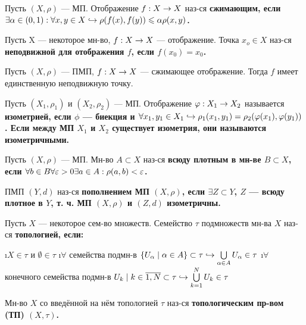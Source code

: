 \begin{defn}
Пусть $(X, \rho)$ --- МП. Отображение $f: X \rightarrow X$ наз-ся \bf{сжимающим}, если $\exists \alpha \in (0, 1): \forall x, y \in X \hookrightarrow \rho(f(x), f(y)) \leqslant \alpha \rho(x, y)$.
\end{defn}

\begin{defn}
Пусть X --- некоторое мн-во, $f: X \rightarrow X$ --- отображение. Точка $x_o \in X$ наз-ся \bf{неподвижной} для отображения $f$, если $f(x_0) = x_0$.
\end{defn}

\begin{thm}
Пусть $(X, \rho)$ --- ПМП, $f: X \rightarrow X$ --- сжимающее отображение. Тогда $f$ имеет единственную неподвижную точку.
\end{thm}

\begin{defn}
Пусть $(X_1, \rho_1)$ и $(X_2, \rho_2)$ --- МП. Отображение $\varphi: X_1 \rightarrow X_2$ называется \bf{изометрией}, если $\phi$ --- биекция и $\forall x_1, y_1 \in X_1 \hookrightarrow \rho_1(x_1, y_1) = \rho_2(\varphi(x_1), \varphi(y_1))$. Если между МП $X_1$ и $X_2$ существует изометрия, они называются \bf{изометричными}.
\end{defn}

\begin{defn}
Пусть $(X, \rho)$ --- МП. Мн-во $A \subset X$ наз-ся \bf{всюду плотным в мн-ве $B \subset X$}, если $\forall b \in B \forall \varepsilon > 0 \exists a \in A: \rho(a, b) < \varepsilon$.
\end{defn}

\begin{defn}
ПМП $(Y, d)$ наз-ся \bf{пополнением} МП $(X, \rho)$, если $\exists Z \subset Y$, $Z$ --- всюду плотное в $Y$, т. ч. МП $(X, \rho)$ и $(Z, d)$ изометричны.
\end{defn}

\begin{defn}
Пусть $X$ --- некоторое сем-во множеств. Семейство $\tau$ подмножеств мн-ва $X$ наз-ся \bf{топологией}, если:
\begin{enumerate}
\i $X \in \tau$ и $\emptyset \in \tau$
\i $\forall$ семейства подмн-в $\{U_\alpha \mid \alpha \in A\} \subset \tau \hookrightarrow \bigcup\limits_{\alpha \in A} U_\alpha \in \tau$
\i $\forall$ конечного семейства подмн-в ${U_k \mid k \in \overline{1,N}} \subset \tau \hookrightarrow \bigcup\limits_{k=1}^N U_k \in \tau$
\end{enumerate}
Мн-во $X$ со введённой на нём топологией $\tau$ наз-ся \bf{топологическим пр-вом (ТП)} $(X, \tau)$.
\end{defn}

